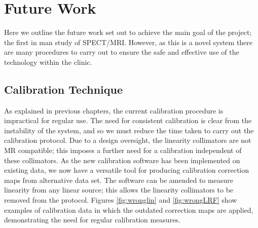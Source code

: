 \chapter{Future Work}
\label{Future}



Here we outline the future work set out to achieve the main goal of the project; the first in man study of \acrshort{SPECT/MRI}. However, as this is a novel system there are many procedures to carry out to ensure the safe and effective use of the technology within the clinic.
\section{Calibration Technique}
As explained in previous chapters, the current calibration procedure is impractical for regular use. The need for consistent calibration is clear from the instability of the system, and so we must reduce the time taken to carry out the calibration protocol. Due to a design oversight, the linearity collimators are not \acrshort{MR} compatible; this imposes a further need for a calibration independent of these collimators. As the new calibration software has been implemented on existing data, we now have a versatile tool for producing calibration correction maps from alternative data set. The software can be amended to measure linearity from any linear source; this allows the linearity collimators to be removed from the protocol. Figures \ref{fig:wronglin} and \ref{fig:wrongLRF} show examples of calibration data in which the outdated correction maps are applied, demonstrating the need for regular calibration measures. 


